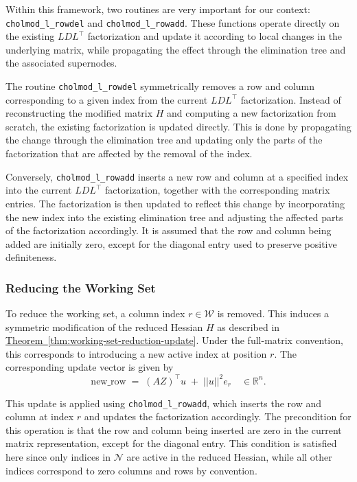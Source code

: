 \documentclass{book}
\theoremstyle{definition}
\newcommand{\thref}[1]{\hyperref[#1]{Theorem~\ref*{#1}}}
\numberwithin{algorithm_}{chapter}
\begin{document}
{\bigskip

Within this framework, two routines are very important for our context: \texttt{cholmod\_l\_rowdel} and \texttt{cholmod\_l\_rowadd}. These functions operate directly on the existing $LDL^\top$ factorization and update it according to local changes in the underlying matrix, while propagating the effect through the elimination tree and the associated supernodes.

\bigskip

The routine \texttt{cholmod\_l\_rowdel} symmetrically removes a row and column corresponding to a given index from the current $LDL^\top$ factorization. Instead of reconstructing the modified matrix $H$ and computing a new factorization from scratch, the existing factorization is updated directly. This is done by propagating the change through the elimination tree and updating only the parts of the factorization that are affected by the removal of the index.

\bigskip

Conversely, \texttt{cholmod\_l\_rowadd} inserts a new row and column at a specified index into the current $LDL^\top$ factorization, together with the corresponding matrix entries. The factorization is then updated to reflect this change by incorporating the new index into the existing elimination tree and adjusting the affected parts of the factorization accordingly. It is assumed that the row and column being added are initially zero, except for the diagonal entry used to preserve positive definiteness.



\subsubsection*{Reducing the Working Set}

To reduce the working set, a column index $r \in \mathcal{W}$ is removed. This induces a symmetric modification of the reduced Hessian $H$ as described in \thref{thm:working-set-reduction-update}.
Under the full-matrix convention, this corresponds to introducing a new active index at position $r$.
The corresponding update vector is given by
\[
\text{new\_row} \; = \; (AZ)^\top u \; + \; ||u||^2 e_r \quad \in \mathbb{R}^n.
\]

This update is applied using \texttt{cholmod\_l\_rowadd}, which inserts the row and column at index $r$ and updates the factorization accordingly.
The precondition for this operation is that the row and column being inserted are zero in the current matrix representation, except for the diagonal entry. This condition is satisfied here since only indices in $\mathcal{N}$ are active in the reduced Hessian, while all other indices correspond to zero columns and rows by convention.



}
\end{document}
